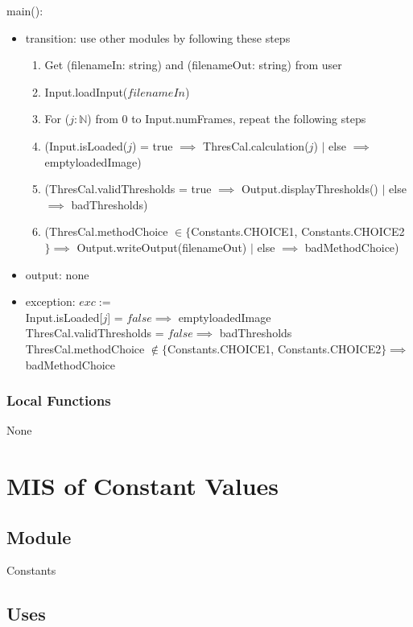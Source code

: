\documentclass[12pt, titlepage]{article}
\begin{document}
\noindent main():
\begin{itemize}
\item transition: use other modules by following these steps
\begin{enumerate}
    \item Get (filenameIn: string) and (filenameOut: string) from user
    \item
    Input.loadInput($filenameIn$)
    \item
    For ($j: \mathbb{N}$) from 0 to Input.numFrames, repeat the following steps
    \item
(Input.isLoaded($j$) = true $\implies$ ThresCal.calculation($j$) $|$ else
$\implies$ emptyloadedImage)
    \item
(ThresCal.validThresholds = true $\implies$ Output.displayThresholds() $|$ else
$\implies$ badThresholds)
\item (ThresCal.methodChoice $\in \{$Constants.CHOICE1, Constants.CHOICE2$\}
\implies$ Output.writeOutput(filenameOut) $|$ else $\implies$ badMethodChoice)
\end{enumerate}
\item output: none
\item exception: $exc :=$\\
Input.isLoaded[$j$] = $false \implies$ emptyloadedImage\\
ThresCal.validThresholds = $false \implies$ badThresholds\\
ThresCal.methodChoice $\not\in \{$Constants.CHOICE1, Constants.CHOICE2$\}
\implies$ badMethodChoice
\end{itemize}

\subsubsection{Local Functions}

None

\newpage

\section{MIS of Constant Values} \label{Md_Constants}
\subsection{Module}
Constants
\subsection{Uses}
\end{document}
